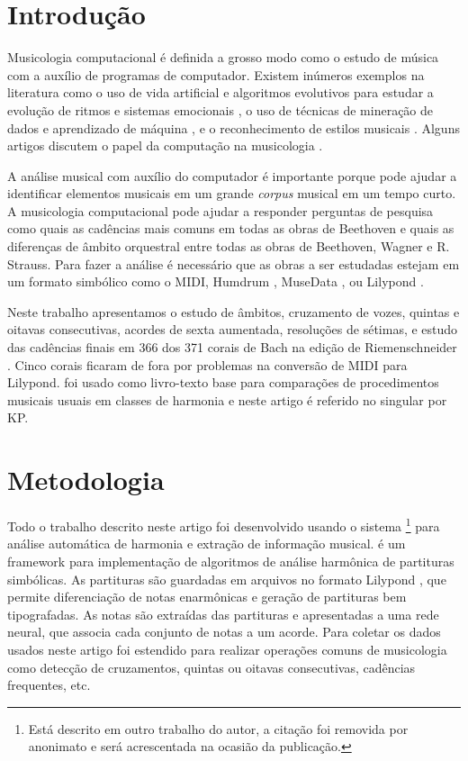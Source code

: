\section{Introdução}
\label{sec:introducao}

Musicologia computacional é definida a grosso modo como o estudo de
música com a auxílio de programas de computador. Existem inúmeros
exemplos na literatura como o uso de vida artificial e algoritmos
evolutivos para estudar a evolução de ritmos e sistemas emocionais
\cite{coutinho05:conputational}, o uso de técnicas de mineração de
dados e aprendizado de máquina \cite{hartmann07:interactive}, e o
reconhecimento de estilos musicais
\cite{kranenburg04:_music_style_recog_quant_approac}. Alguns artigos
discutem o papel da computação na musicologia
\cite{kugel92:beyond,honing04:comeback,cook05:towards}.

A análise musical com auxílio do computador é importante porque pode
ajudar a identificar elementos musicais em um grande \textit{corpus}
musical em um tempo curto. A musicologia computacional pode ajudar a
responder perguntas de pesquisa como quais as cadências mais comuns em
todas as obras de Beethoven e quais as diferenças de âmbito orquestral
entre todas as obras de Beethoven, Wagner e R. Strauss. Para fazer a
análise é necessário que as obras a ser estudadas estejam em um
formato simbólico como o MIDI, Humdrum
\cite{huron99:music_resear_using_humdr}, MuseData
\cite{selfridge-field93:musedata}, ou Lilypond
\cite{nienhuys.ea08:lilypond}.

Neste trabalho apresentamos o estudo de âmbitos, cruzamento de vozes,
quintas e oitavas consecutivas, acordes de sexta aumentada, resoluções
de sétimas, e estudo das cadências finais em 366 dos 371 corais de
Bach na edição de Riemenschneider \cite{bach41:371}. Cinco corais
ficaram de fora por problemas na conversão de MIDI para Lilypond.
\cite{kostka.ea00:tonal} foi usado como livro-texto base para
comparações de procedimentos musicais usuais em classes de harmonia e
neste artigo é referido no singular por KP.

\section{Metodologia}
\label{sec:metodologia}

Todo o trabalho descrito neste artigo foi desenvolvido usando o
sistema \rameau{}\footnote{Está descrito em outro trabalho do autor, a
  citação foi removida por anonimato e será acrescentada na ocasião da
  publicação.} para análise automática de harmonia e extração de
informação musical. \rameau{} é um framework para implementação de
algoritmos de análise harmônica de partituras simbólicas. As
partituras são guardadas em arquivos no formato Lilypond
\cite{nienhuys.ea08:lilypond}, que permite diferenciação de notas
enarmônicas e geração de partituras bem tipografadas. As notas são
extraídas das partituras e apresentadas a uma rede neural, que associa
cada conjunto de notas a um acorde. Para coletar os dados usados neste
artigo \rameau{} foi estendido para realizar operações comuns de
musicologia como detecção de cruzamentos, quintas ou oitavas
consecutivas, cadências frequentes, etc.

